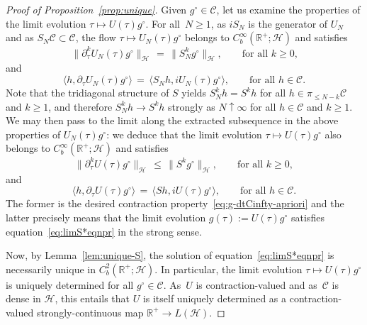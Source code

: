 \documentclass[a4paper,11pt,reqno,noindent]{amsart}
\theoremstyle{plain}
\numberwithin{equation}{section}
\newcommand{\R}{\mathbb R}
\newcommand{\Cc}{\mathcal C}
\newcommand{\Hc}{\mathcal H}
\newcommand{\3}{|\!|\!|}
\begin{document}
\begin{proof}[Proof of Proposition~\ref{prop:unique}]
Given $g^\circ\in\Cc$, let us examine the properties of the limit evolution $\tau\mapsto U(\tau)g^\circ$.
For all~$N\ge1$, as $i S_N$ is the generator of $U_N$ and as $S_N\Cc\subset\Cc$, the flow $\tau\mapsto U_N(\tau)g^\circ$ belongs to $C^\infty_b(\R^+;\Hc)$ and satisfies
\begin{equation}\label{eq:stability-SNUN}
\|\partial_\tau^kU_N(\tau)g^\circ\|_\Hc\,=\,
\|S_N^kg^\circ\|_\Hc,\qquad\text{for all $k\ge0$,}
\end{equation}
and
\[\langle h,\partial_\tau U_N(\tau)g^\circ\rangle\,=\,\langle S_Nh,iU_N(\tau)g^\circ\rangle,\qquad\text{for all $h\in\Cc$}.\]
Note that the tridiagonal structure of $S$ yields $S_N^kh=S^kh$ for all $h\in\pi_{\le N-k}\Cc$ and $k\ge1$, and therefore $S_N^kh\to S^kh$ strongly as $N\uparrow\infty$ for all $h\in\Cc$ and $k\ge1$.
We may then pass to the limit along the extracted subsequence in the above properties of $U_N(\tau)g^\circ$: we deduce that the limit evolution $\tau\mapsto U(\tau)g^\circ$ also belongs to $C^\infty_b(\R^+;\Hc)$ and satisfies
\begin{equation}\label{eq:stability-SU}
\|\partial_\tau^kU(\tau)g^\circ\|_\Hc\,\le\,\|S^kg^\circ\|_\Hc,\qquad\text{for all $k\ge0$},
\end{equation}
and
\[\langle h,\partial_\tau U(\tau)g^\circ\rangle\,=\,\langle Sh,iU(\tau)g^\circ\rangle,\qquad\text{for all $h\in\Cc$}.\]
The former is the desired contraction property~\eqref{eq:g-dtCinfty-apriori} and the latter precisely means that the limit evolution $g(\tau):=U(\tau)g^\circ$ satisfies equation~\eqref{eq:limS*eqnpr} in the strong sense.

Now, by Lemma~\ref{lem:unique-S}, the solution of equation~\eqref{eq:limS*eqnpr} is necessarily unique in $C^2_b(\R^+;\Hc)$.
In particular, the limit evolution $\tau\mapsto U(\tau)g^\circ$ is uniquely determined for all $g^\circ\in\Cc$. As~$U$ is contraction-valued and as~$\Cc$ is dense in $\Hc$, this entails that $U$ is itself uniquely determined as a contraction-valued strongly-continuous map $\R^+\to L(\Hc)$.


\end{proof}
\end{document}
